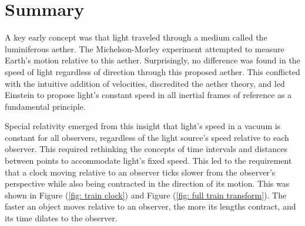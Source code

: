 



\section{Summary}

A key early concept was that light traveled through a medium called the luminiferous aether.
The Michelson-Morley experiment attempted to measure Earth's motion relative to this aether.
Surprisingly, no difference was found in the speed of light regardless of direction through this proposed aether.
This conflicted with the intuitive addition of velocities, discredited the aether theory, and led Einstein to propose light's constant speed in all inertial frames of reference as a fundamental principle.

Special relativity emerged from this insight that light's speed in a vacuum is constant for all observers, regardless of the light source's speed relative to each observer.
This required rethinking the concepts of time intervals and distances between points to accommodate light's fixed speed.
This led to the requirement that a clock moving relative to an observer ticks slower from the observer's perspective while also being contracted in the direction of its motion.
This was shown in Figure (\ref{fig: train clock}) and Figure (\ref{fig: full train transform}).
The faster an object moves relative to an observer, the more its lengths contract, and its time dilates to the observer.

